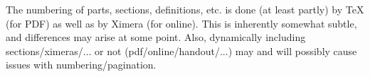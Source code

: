 \documentclass{ximera}
\begin{document}

The numbering of parts, sections, definitions, etc. is done (at least partly) by TeX (for PDF) as well as by Ximera (for online). This is inherently somewhat subtle, and differences may arise at some point. Also, dynamically including sections/ximeras/... or not (pdf/online/handout/...) may and will possibly cause issues with numbering/pagination.
\end{document}
